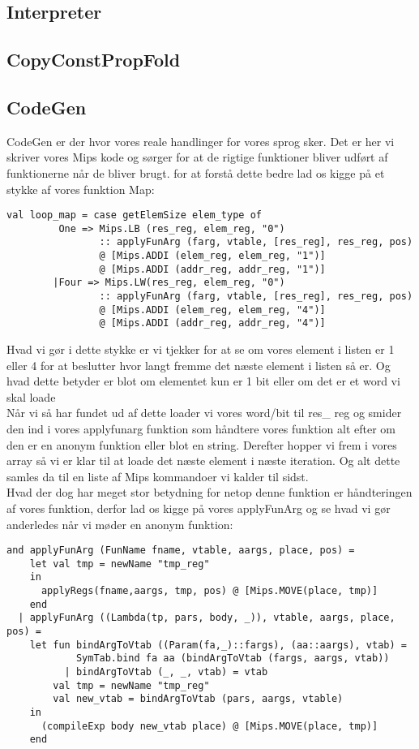 \documentclass[a4paper]{article}
\begin{document}
\subsection{Interpreter}
\subsection{CopyConstPropFold}
\subsection{CodeGen}
CodeGen er der hvor vores reale handlinger for vores sprog sker. Det er her vi skriver vores Mips kode og sørger for at de rigtige funktioner bliver udført af funktionerne når de bliver brugt. for at forstå dette bedre lad os kigge på et stykke af vores funktion Map:
\begin{lstlisting}
val loop_map = case getElemSize elem_type of
         One => Mips.LB (res_reg, elem_reg, "0")
                :: applyFunArg (farg, vtable, [res_reg], res_reg, pos)
                @ [Mips.ADDI (elem_reg, elem_reg, "1")]
                @ [Mips.ADDI (addr_reg, addr_reg, "1")]
        |Four => Mips.LW(res_reg, elem_reg, "0")
                :: applyFunArg (farg, vtable, [res_reg], res_reg, pos)
                @ [Mips.ADDI (elem_reg, elem_reg, "4")]
                @ [Mips.ADDI (addr_reg, addr_reg, "4")]
\end{lstlisting}
Hvad vi gør i dette stykke er vi tjekker for at se om vores element i listen er 1 eller 4 for at beslutter hvor langt fremme det næste element i listen så er. Og hvad dette betyder er blot om elementet kun er 1 bit eller om det er et word vi skal loade\\
Når vi så har fundet ud af dette loader vi vores word/bit til res\_ reg og smider den ind i vores applyfunarg funktion som håndtere vores funktion alt efter om den er en anonym funktion eller blot en string. Derefter hopper vi frem i vores array så vi er klar til at loade det næste element i næste iteration. Og alt dette samles da til en liste af Mips kommandoer vi kalder til sidst.\\[0.1in]
Hvad der dog har meget stor betydning for netop denne funktion er håndteringen af vores funktion, derfor lad os kigge på vores applyFunArg og se hvad vi gør anderledes når vi møder en anonym funktion:
\begin{lstlisting}
and applyFunArg (FunName fname, vtable, aargs, place, pos) =
    let val tmp = newName "tmp_reg"
    in
      applyRegs(fname,aargs, tmp, pos) @ [Mips.MOVE(place, tmp)]
    end
  | applyFunArg ((Lambda(tp, pars, body, _)), vtable, aargs, place, pos) =
    let fun bindArgToVtab ((Param(fa,_)::fargs), (aa::aargs), vtab) =
            SymTab.bind fa aa (bindArgToVtab (fargs, aargs, vtab))
          | bindArgToVtab (_, _, vtab) = vtab
        val tmp = newName "tmp_reg"
        val new_vtab = bindArgToVtab (pars, aargs, vtable)
    in
      (compileExp body new_vtab place) @ [Mips.MOVE(place, tmp)]
    end
\end{lstlisting}
\end{document}
